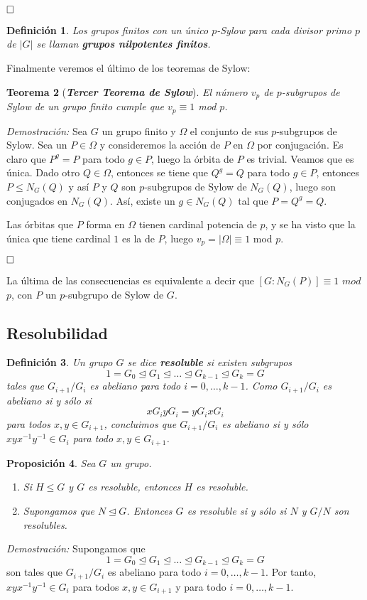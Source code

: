 \documentclass[12pt]{article}
\newtheorem{theorem}{Teorema}[section]
\newtheorem{proposition}[theorem]{Proposición}
\newtheorem{definition}[theorem]{Definición}
\begin{document}
$\hfill \square$

\begin{definition}Los grupos finitos con un único $p$-Sylow para cada divisor primo $p$ de $|G|$ se llaman \textbf{grupos nilpotentes finitos}.
\end{definition}

Finalmente veremos el último de los teoremas de Sylow:

\begin{theorem}[\textit{\textbf{Tercer Teorema de Sylow}}]
El número $v_{p}$ de $p$-subgrupos de Sylow de un grupo finito cumple que $v_{p} \equiv 1$ mod $p$.
\end{theorem}
\emph{Demostración: }Sea $G$ un grupo finito y $\Omega$ el conjunto de sus $p$-subgrupos de Sylow. Sea un $P \in \Omega$ y consideremos la acción de $P$ en $\Omega$ por conjugación. Es claro que $P^{g}=P$ para todo $g \in P$, luego la órbita de $P$ es trivial. Veamos que es única. Dado otro $Q \in \Omega$, entonces se tiene que $Q^{g} = Q$ para todo $g \in P$, entonces $P \leq N_{G}(Q)$ y así $P$ y $Q$ son $p$-subgrupos de Sylow de $N_{G}(Q)$, luego son conjugados en $N_{G}(Q)$. Así, existe un $g \in N_{G}(Q)$ tal que $P = Q^{g}= Q$.

Las órbitas que $P$ forma en $\Omega$ tienen cardinal potencia de $p$, y se ha visto que la única que tiene cardinal $1$ es la de $P$, luego $v_{p}=|\Omega| \equiv 1$ mod $p$.

$\hfill \square$

La última de las consecuencias es equivalente a decir que $\left[ G:N_{G}(P) \right] \equiv 1$ $mod$ $p$, con $P$ un $p$-subgrupo de Sylow de $G$.

\subsection{Resolubilidad}

\begin{definition}Un grupo $G$ se dice \textbf{resoluble} si existen subgrupos $$1 = G_0 \unlhd G_1 \unlhd \ldots \unlhd G_{k-1} \unlhd G_{k} = G$$ tales que $G_{i+1}/G_i$ es abeliano para todo $i= 0, \ldots, k-1$. Como $G_{i+1}/G_i$ es abeliano si y sólo si $$xG_iyG_i = yG_ixG_i$$ para todos $x,y \in G_{i+1}$, concluimos que $G_{i+1}/G_i$ es abeliano si y sólo $xyx^{-1}y^{-1} \in G_i$ para todo $x,y \in G_{i+1}$.
\end{definition}

\begin{proposition} \label{eq:reso1} Sea $G$ un grupo.
\begin{enumerate}
\item Si $H \leq G$ y $G$ es resoluble, entonces $H$ es resoluble.
\item Supongamos que $N \unlhd G$. Entonces $G$ es resoluble si y sólo si $N$ y $G/N$ son resolubles.
\end{enumerate}
\end{proposition}
\emph{Demostración: }Supongamos que $$1 = G_0 \unlhd G_1 \unlhd \ldots \unlhd G_{k-1} \unlhd G_k = G$$ son tales que $G_{i+1}/G_i$ es abeliano para todo $i = 0, \ldots, k-1$. Por tanto, $xyx^{-1}y^{-1} \in G_i$ para todos $x,y \in G_{i+1}$ y para todo $i = 0, \ldots, k -1$.
\end{document}
